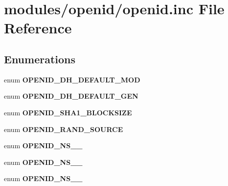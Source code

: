 \hypertarget{openid_8inc}{
\section{modules/openid/openid.inc File Reference}
\label{openid_8inc}
}
\subsection*{Enumerations}
\begin{CompactItemize}
\item 
enum \textbf{OPENID\_\-DH\_\-DEFAULT\_\-MOD} 
\item 
enum \textbf{OPENID\_\-DH\_\-DEFAULT\_\-GEN} 
\item 
enum \textbf{OPENID\_\-SHA1\_\-BLOCKSIZE} 
\item 
enum \textbf{OPENID\_\-RAND\_\-SOURCE} 
\item 
enum \textbf{OPENID\_\-NS\_\_} 
\item 
enum \textbf{OPENID\_\-NS\_\_} 
\item 
enum \textbf{OPENID\_\-NS\_\_} 
\end{CompactItemize}
